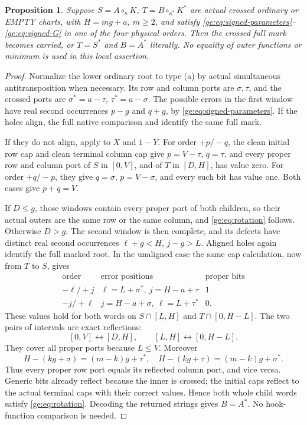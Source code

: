 \documentclass[11pt,a4paper]{amsart}
\numberwithin{equation}{section}
\theoremstyle{plain}
\newtheorem{proposition}[theorem]{Proposition}
\theoremstyle{definition}
\begin{document}
\begin{proposition}\label{ge:crossed-cover}
Suppose \(S=A\circ_\kappa K\),
\(T=B\circ_{\kappa^*}K^*\) are actual crossed ordinary or EMPTY charts,
with \(H=mg+a\), \(m\ge2\), and satisfy
\eqref{ge:eq:signed-parameters}--\eqref{ge:eq:signed-G} in one of the
four physical orders.  Then the crossed full mark becomes carried, or
\(T=S^*\) and \(B=A^*\) literally.  No equality of outer functions or
minimum is used in this local assertion.
\end{proposition}
\begin{proof}
Normalize the lower ordinary root to type (a) by actual simultaneous
antitransposition when necessary.  Its row and column ports are
\(\sigma,\tau\), and the crossed ports are
\(\sigma^*=a-\tau\), \(\tau^*=a-\sigma\).
The possible errors in the first window have real second occurrences
\(p-g\) and \(q+g\), by \eqref{ge:eq:signed-parameters}.  If the
holes align, the full native comparison and
 identify the same full mark.

If they do not align, apply  to \(X\) and \(1-Y\).
For order \(+p/-q\), the clean initial row cap and clean terminal
column cap give
\(p=V-\tau\), \(q=\tau\), and every proper row and column port of
\(S\) in \([0,V]\), and of \(T\) in \([D,H]\), has value zero.
For order \(+q/-p\), they give
\(q=\sigma\), \(p=V-\sigma\), and every such bit has value one.
Both cases give \(p+q=V\).

If \(D\le g\), those windows contain every proper port of both
children, so their actual outers are the same row or the same column,
and \eqref{ge:eq:rotation} follows.  Otherwise \(D>g\).  The second
window is then complete, and its defects have distinct real second
occurrences \(\ell+g<H\), \(j-g>L\).  Aligned holes again identify
the full marked root.  In the unaligned case the same cap calculation,
now from \(T\) to \(S\), gives
\[
\begin{array}{c|c|c}
\text{order}&\text{error positions}&\text{proper bits}\\ \hline
-\ell/+j&\ell=L+\sigma^*,\ j=H-a+\tau&1\\
-j/+\ell&j=H-a+\sigma,\ \ell=L+\tau^*&0.
\end{array}
\]
These values hold for both words on \(S\cap[L,H]\) and
\(T\cap[0,H-L]\).  The two pairs of intervals are exact reflections:
\[
 [0,V]\longleftrightarrow[D,H],\qquad
 [L,H]\longleftrightarrow[0,H-L].
\]
They cover all proper ports because \(L\le V\).  Moreover
\[
 H-(kg+\sigma)=(m-k)g+\tau^*,\quad
 H-(kg+\tau)=(m-k)g+\sigma^*.
\]
Thus every proper row port equals its reflected column port, and vice
versa.  Generic bits already reflect because the inner is crossed; the
initial caps reflect to the actual terminal caps with their correct
values.  Hence both whole child words satisfy \eqref{ge:eq:rotation}.
Decoding the returned strings gives \(B=A^*\).  No hook-function
comparison is needed.
\end{proof}
\end{document}
